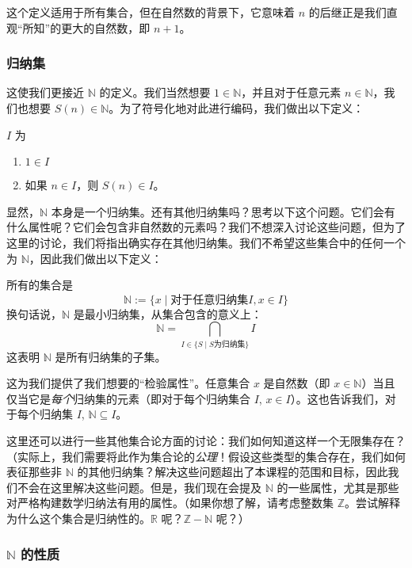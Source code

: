 这个定义适用于所有集合，但在自然数的背景下，它意味着 $n$ 的后继正是我们直观``所知''的更大的自然数，即 $n + 1$。

\subsubsection*{归纳集}

这使我们更接近 $\mathbb{N}$ 的定义。我们当然想要 $1 \in \mathbb{N}$，并且对于任意元素 $n \in \mathbb{N}$，我们也想要 $S(n) \in \mathbb{N}$。为了符号化地对此进行编码，我们做出以下定义：

\begin{definition}
    $I$ 为
    \begin{enumerate}
        \item $1 \in I$
        \item 如果 $n \in I$，则 $S(n) \in I$。
    \end{enumerate}
\end{definition}

显然，$\mathbb{N}$ 本身是一个归纳集。还有其他归纳集吗？思考以下这个问题。它们会有什么属性呢？它们会包含非自然数的元素吗？我们不想深入讨论这些问题，但为了这里的讨论，我们将指出确实存在其他归纳集。我们不希望这些集合中的任何一个为 $\mathbb{N}$，因此我们做出以下定义：

\begin{definition}
    所有的集合是
    \[\mathbb{N} := \{x \mid \text{对于任意归纳集} I, x \in I\}\]
    换句话说，$\mathbb{N}$ 是最小归纳集，从集合包含的意义上：
    \[\mathbb{N} = \bigcap_{I \in \{S \mid S \text{为归纳集}\}} I\]
    这表明 $\mathbb{N}$ 是所有归纳集的子集。
\end{definition}

这为我们提供了我们想要的``检验属性''。任意集合 $x$ 是自然数（即 $x \in \mathbb{N}$）当且仅当它是\emph{每个}归纳集的元素（即对于每个归纳集合 $I$, $x \in I$）。这也告诉我们，对于每个归纳集 $I$, $\mathbb{N} \subseteq I$。

这里还可以进行一些其他集合论方面的讨论：我们如何知道这样一个无限集存在？（实际上，我们需要将此作为集合论的\emph{公理}！假设这些类型的集合存在，我们如何表征那些非 $\mathbb{N}$ 的其他归纳集？解决这些问题超出了本课程的范围和目标，因此我们不会在这里解决这些问题。但是，我们现在会提及 $\mathbb{N}$ 的一些属性，尤其是那些对严格构建数学归纳法有用的属性。（如果你想了解，请考虑整数集 $\mathbb{Z}$。尝试解释为什么这个集合是归纳性的。$\mathbb{R}$ 呢？$\mathbb{Z} - \mathbb{N}$ 呢？）

\subsubsection*{$\mathbb{N}$ 的性质}

